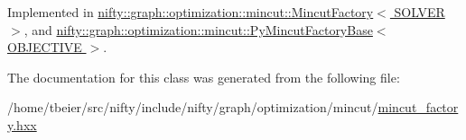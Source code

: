 Implemented in \hyperlink{classnifty_1_1graph_1_1optimization_1_1mincut_1_1MincutFactory_a316ece1ccb671de2cf96c105da3c6a98}{nifty\+::graph\+::optimization\+::mincut\+::\+Mincut\+Factory$<$ S\+O\+L\+V\+E\+R $>$}, and \hyperlink{classnifty_1_1graph_1_1optimization_1_1mincut_1_1PyMincutFactoryBase_a8bfe09d94839ce42210150f3a3e408d6}{nifty\+::graph\+::optimization\+::mincut\+::\+Py\+Mincut\+Factory\+Base$<$ O\+B\+J\+E\+C\+T\+I\+V\+E $>$}.



The documentation for this class was generated from the following file\+:\begin{DoxyCompactItemize}
\item 
/home/tbeier/src/nifty/include/nifty/graph/optimization/mincut/\hyperlink{mincut__factory_8hxx}{mincut\+\_\+factory.\+hxx}\end{DoxyCompactItemize}
